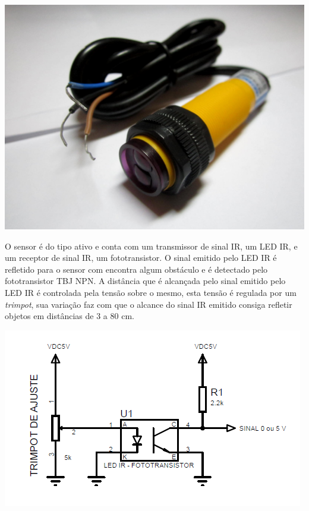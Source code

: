             \begin{center}
    	\includegraphics[scale=0.40]{figuras/ed18.jpg}
        \label{ir_model}
    \end{center}
    
	O sensor é do tipo ativo e conta com um transmissor de sinal IR, um LED IR, e um receptor de sinal IR, um fototransistor. O sinal emitido pelo LED IR é refletido para o sensor com encontra algum obstáculo e é detectado pelo fototransistor TBJ NPN. A distância que é alcançada pelo sinal emitido pelo LED IR é controlada pela tensão sobre o mesmo, esta tensão é regulada por um \textit{trimpot}, sua variação faz com que o alcance do sinal IR emitido consiga refletir objetos em distâncias de 3 a 80 cm. 
    
            \begin{center}
    	\includegraphics[scale=0.70]{figuras/IR_CIRCUIT.png}
        \label{ir_circuit}
    \end{center}

